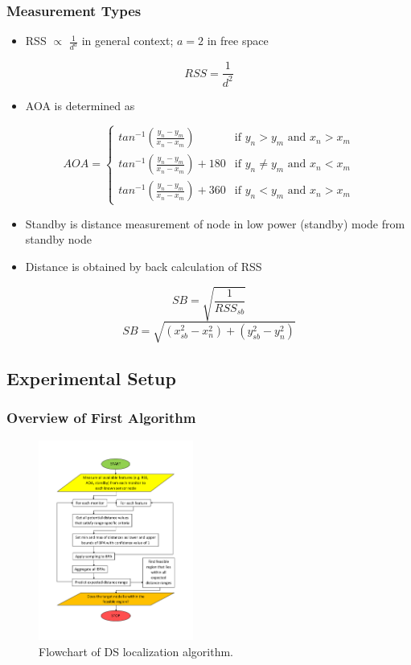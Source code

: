 \documentclass{beamer}
\begin{document}
\begin{frame}[allowframebreaks]
\frametitle{Measurement Types}
\begin{itemize}
\item{RSS $\propto$ $\frac{1}{d^a}$ in general context; $a=2$ in free space}
\end{itemize}
\begin{equation}
RSS = \frac{1}{d^2}
\end{equation}
\begin{itemize}
\item{AOA is determined as}
\end{itemize}
\begin{equation}
 AOA =
  \begin{cases}
   tan^{-1}(\frac{y_n-y_m}{x_n-x_m}) & \text{if } y_n > y_m \text{ and } x_n > x_m \\
   tan^{-1}(\frac{y_n-y_m}{x_n-x_m}) + 180       & \text{if } y_n \neq y_m \text{ and } x_n < x_m \\
   tan^{-1}(\frac{y_n-y_m}{x_n-x_m}) + 360       & \text{if } y_n < y_m \text{ and } x_n > x_m
  \end{cases}
\label{aoa}
\end{equation}
\framebreak
\begin{itemize}
\item{Standby is distance measurement of node in low power (standby) mode from standby node}
\item{Distance is obtained by back calculation of RSS}
\end{itemize}
\begin{equation}
SB = \sqrt{\frac{1}{RSS_{sb}}}
\end{equation}
\begin{equation}
SB = \sqrt{(x_{sb}^2 - x_n^2) + (y_{sb}^2 - y_n^2)}
\end{equation}
\end{frame}

\subsection{Experimental Setup}

\begin{frame}
\frametitle{Overview of First Algorithm}
\begin{figure}[!t]
\centering
\includegraphics[width=2in]{flowchart1}
\caption{Flowchart of DS localization algorithm.}
\label{dsalg1}
\end{figure}
\end{frame}
\end{document}

